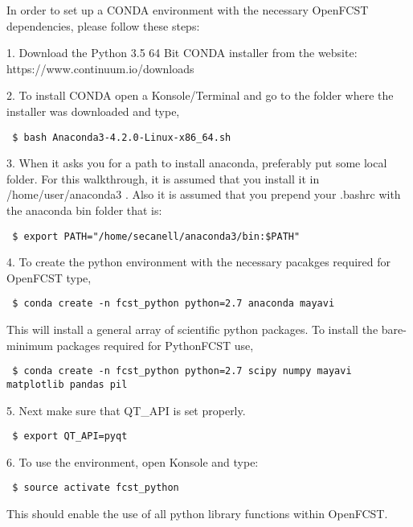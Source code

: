 In order to set up a CONDA environment with the necessary OpenFCST dependencies, please follow these steps:

1. Download the Python 3.5 64 Bit CONDA installer from the website: https://www.continuum.io/downloads

2. To install CONDA open a Konsole/Terminal and go to the folder where the installer was downloaded and type,

\begin{lstlisting}
 $ bash Anaconda3-4.2.0-Linux-x86_64.sh
\end{lstlisting}

3. When it asks you for a path to install anaconda, preferably put some local folder. For this walkthrough, it is assumed that you install it in /home/user/anaconda3 . Also it is assumed that you prepend your .bashrc with the anaconda bin folder that is: 

\begin{lstlisting}
 $ export PATH="/home/secanell/anaconda3/bin:$PATH"
\end{lstlisting}

4. To create the python environment with the necessary pacakges required for OpenFCST type,

\begin{lstlisting}
 $ conda create -n fcst_python python=2.7 anaconda mayavi
\end{lstlisting}
    
This will install a general array of scientific python packages. To install the bare-minimum packages required for PythonFCST use,

\begin{lstlisting}
 $ conda create -n fcst_python python=2.7 scipy numpy mayavi matplotlib pandas pil
\end{lstlisting}

5. Next make sure that QT\_API is set properly. 

\begin{lstlisting}
 $ export QT_API=pyqt
\end{lstlisting}

6. To use the environment, open Konsole and type:

\begin{lstlisting}
 $ source activate fcst_python
\end{lstlisting}


This should enable the use of all python library functions within OpenFCST. 



